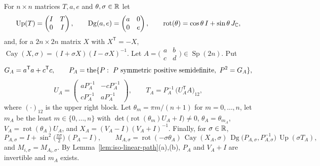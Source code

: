 \begin{definition}\label{def:iso-linear-path}
For $n\times n$ matrices $T,a,e$ and $\theta,\sigma\in\mathbb{R}$ let
\[
 \operatorname{Up}(T)=\begin{pmatrix}I&T\\0&I\end{pmatrix},\qquad
 \operatorname{Dg}(a,e)=\begin{pmatrix}a&0\\0&e\end{pmatrix},\qquad
 \operatorname{rot}(\theta)=\cos\theta\,I+\sin\theta\,J_{\mathbb{C}} ,
\]
and, for a $2n\times2n$ matrix $X$ with $X^{\mathsf T}=-X$,
$\operatorname{Cay}(X,\sigma)=(I+\sigma X)(I-\sigma X)^{-1}$. Let $A=\bigl(\begin{smallmatrix}a&b\\c&d\end{smallmatrix}\bigr)
\in\operatorname{Sp}(2n)$. Put
\[
 G_A=a^{\mathsf T}a+c^{\mathsf T}c,\qquad P_A=\defdesc\{P:\ P\text{ symmetric positive semidefinite},\ P^2=G_A\},
\]
\[
 U_A=\begin{pmatrix}aP_A^{-1}&-cP_A^{-1}\\cP_A^{-1}&aP_A^{-1}\end{pmatrix},\qquad
 T_A=P_A^{-1}\,\big(U_A^{\mathsf T}A\big)_{12},
\]
where $(\cdot)_{12}$ is the upper right block. Let $\theta_m=\pi m/(n+1)$ for $m=0,\dots,n$, let $m_A$ be the least
$m\in\{0,\dots,n\}$ with $\det\big(\operatorname{rot}(\theta_m)U_A+I\big)\ne0$, $\theta_A=\theta_{m_A}$,
$V_A=\operatorname{rot}(\theta_A)U_A$, and $X_A=(V_A-I)(V_A+I)^{-1}$. Finally, for $\sigma\in\mathbb{R}$,
\[
 P_{A,\sigma}=I+\sin^2\!\big(\tfrac{\pi\sigma}2\big)\,(P_A-I),\qquad
 M_{A,\sigma}=\operatorname{rot}(-\sigma\theta_A)\,\operatorname{Cay}(X_A,\sigma)\,
 \operatorname{Dg}\big(P_{A,\sigma},P_{A,\sigma}^{-1}\big)\,\operatorname{Up}(\sigma T_A),
\]
and $M_{i,\sigma}=M_{A_i,\sigma}$. By Lemma~\ref{lem:iso-linear-path}(a),(b), $P_A$ and $V_A+I$ are invertible and $m_A$ exists.
\end{definition}

